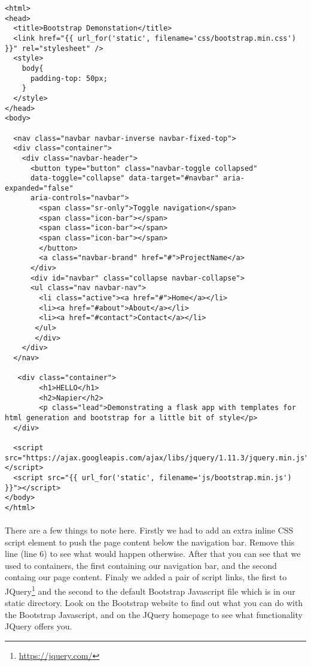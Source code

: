 \documentclass[12pt, a4paper, twoside]{book}
\begin{document}
\begin{lstlisting}
<html>
<head>
  <title>Bootstrap Demonstation</title>
  <link href="{{ url_for('static', filename='css/bootstrap.min.css') }}" rel="stylesheet" />
  <style>
    body{ 
      padding-top: 50px;
    } 
  </style>
</head>
<body>

  <nav class="navbar navbar-inverse navbar-fixed-top">
  <div class="container">
    <div class="navbar-header">
      <button type="button" class="navbar-toggle collapsed"
      data-toggle="collapse" data-target="#navbar" aria-expanded="false"
      aria-controls="navbar">
        <span class="sr-only">Toggle navigation</span>
        <span class="icon-bar"></span>
        <span class="icon-bar"></span>
        <span class="icon-bar"></span>
        </button>
        <a class="navbar-brand" href="#">ProjectName</a>
      </div>
      <div id="navbar" class="collapse navbar-collapse">
      <ul class="nav navbar-nav">
        <li class="active"><a href="#">Home</a></li>
        <li><a href="#about">About</a></li>
        <li><a href="#contact">Contact</a></li>
       </ul>
       </div>
    </div>
  </nav>

   <div class="container">
        <h1>HELLO</h1>
        <h2>Napier</h2>
        <p class="lead">Demonstrating a flask app with templates for html generation and bootstrap for a little bit of style</p>
  </div>

  <script src="https://ajax.googleapis.com/ajax/libs/jquery/1.11.3/jquery.min.js"></script>
  <script src="{{ url_for('static', filename='js/bootstrap.min.js') }}"></script>
</body>
</html>
\end{lstlisting}

\paragraph{} There are a few things to note here. Firstly we had to add an extra inline CSS script element to push the page content below the navigation bar. Remove this line (line 6) to see what would happen otherwise. After that you can see that we used to containers, the first containing our navigation bar, and the second containg our page content. Finaly we added a pair of script links, the first to JQuery\footnote{\url{https://jquery.com/}} and the second to the default Bootstrap Javascript file which is in our static directory. Look on the Bootstrap website to find out what you can do with the Bootstrap Javascript, and on the JQuery homepage to see what functionality JQuery offers you.
\end{document}
